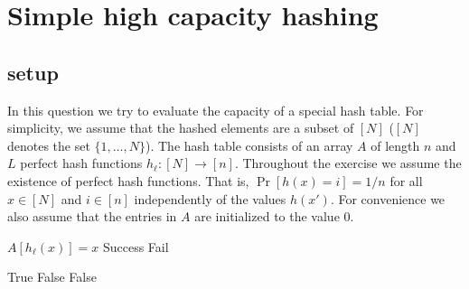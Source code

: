 \documentclass{article}
\begin{document}

\section{Simple high capacity hashing}
\subsection*{setup}
In this question we try to evaluate the capacity of a special hash table.
For simplicity, we assume that the hashed elements are a subset of $[N]$ ($[N]$ denotes the set $\{1,\dots,N\}$).
The hash table consists of an array $A$ of length $n$ and $L$ perfect hash functions $h_\ell: [N] \rightarrow [n]$.
Throughout the exercise we assume the existence of perfect hash functions. That is, $\Pr[h(x) = i] = 1/n$ for all $x \in [N]$ and $i\in [n]$ 
independently of the values $h(x')$.  For convenience we also assume that the entries in $A$ are initialized to the value $0$.
%
\begin{algorithm}
\caption{$Add(x)$}
\begin{algorithmic}
\FOR {$\ell \in [L]$}
    	\STATE $A[h_\ell(x)] = x$
	\STATE \RETURN Success
    \ENDIF
\ENDFOR
\STATE \RETURN Fail
\end{algorithmic}
\end{algorithm}
%
\vspace{-.6cm}
\begin{algorithm}
\caption{$Query(x)$}
\begin{algorithmic}
\FOR {$\ell \in [L]$}
	\STATE \RETURN True
   	\STATE \RETURN False
    \ENDIF
\ENDFOR
\STATE \RETURN False
\end{algorithmic}
\end{algorithm}
%
\vspace{-.6cm}
\end{document}
